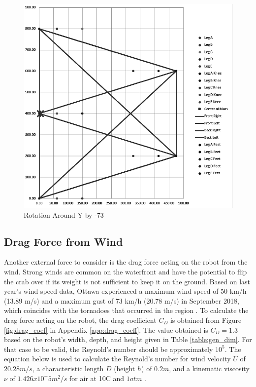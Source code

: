 \begin{figure} [H]
    \centering
    \includegraphics[width=\textwidth]{5_KinematicAndForces/img/CenterMass_-73_Y.PNG}
    \caption{Rotation Around Y by -73\textdegree{}}
    \label{fig:rotation_-73}
\end{figure}




\subsection{Drag Force from Wind} \label{subsec:wind}

Another external force to consider is the drag force acting on the robot from the wind. Strong winds are common on the waterfront and have the potential to flip the crab over if its weight is not sufficient to keep it on the ground. Based on last year's wind speed data, Ottawa experienced a maximum wind speed of 50 km/h (13.89 m/s) and a maximum gust of 73 km/h (20.78 m/s) in September 2018, which coincides with the tornadoes that occurred in the region \cite{weatherstats_wind_2019}. To calculate the drag force acting on the robot, the drag coefficient $C_{D}$ is obtained from Figure \ref{fig:drag_coef} in Appendix \ref{app:drag_coeff}. The value obtained is $C_{D} = 1.3$ based on the robot's width, depth, and height given in Table \ref{table:gen_dim}. For that case to be valid, the Reynold's number should be approximately $10^5$. The equation below is used to calculate the Reynold's number for wind velocity $U$ of $20.28 m/s$, a characteristic length $D$ (height $h$) of $0.2 m$, and a kinematic viscosity $\nu$ of $1.426x10^-5 m^2/s$ for air at 10\textdegree{}C and $1 atm$ \cite{munson_fundamentals_2009}\cite{engineers_edge_viscosity_2019}.

